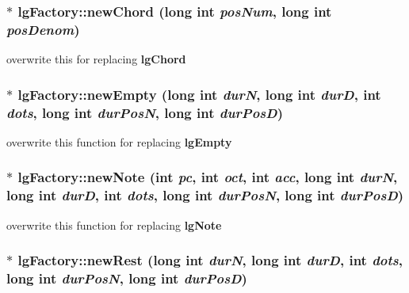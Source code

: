 \subsubsection{ $\ast$ lg\-Factory::new\-Chord (long int {\em pos\-Num}, long int {\em pos\-Denom})\hspace{0.3cm}{\tt  [virtual]}}\label{classlgFactory_a3}


overwrite this for replacing {\bf lg\-Chord} 

\subsubsection{ $\ast$ lg\-Factory::new\-Empty (long int {\em dur\-N}, long int {\em dur\-D}, int {\em dots}, long int {\em dur\-Pos\-N}, long int {\em dur\-Pos\-D})\hspace{0.3cm}{\tt  [virtual]}}\label{classlgFactory_a5}


overwrite this function for replacing {\bf lg\-Empty} 

\subsubsection{ $\ast$ lg\-Factory::new\-Note (int {\em pc}, int {\em oct}, int {\em acc}, long int {\em dur\-N}, long int {\em dur\-D}, int {\em dots}, long int {\em dur\-Pos\-N}, long int {\em dur\-Pos\-D})\hspace{0.3cm}{\tt  [virtual]}}\label{classlgFactory_a4}


overwrite this function for replacing {\bf lg\-Note} 

\subsubsection{ $\ast$ lg\-Factory::new\-Rest (long int {\em dur\-N}, long int {\em dur\-D}, int {\em dots}, long int {\em dur\-Pos\-N}, long int {\em dur\-Pos\-D})\hspace{0.3cm}{\tt  [virtual]}}\label{classlgFactory_a6}


